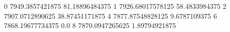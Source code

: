0 7949.3857421875 81.18896484375
1 7926.68017578125 58.4833984375
2 7907.0712890625 38.87451171875
4 7877.87548828125 9.6787109375
6 7868.19677734375 0.0
8 7870.0947265625 1.89794921875
